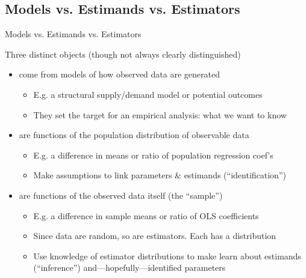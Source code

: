 \documentclass{beamer}
\begin{document}
\subsection{Models vs. Estimands vs. Estimators}
\begin{frame}{Models vs. Estimands vs. Estimators}

Three distinct objects (though not always clearly distinguished) \pause\medskip

\begin{itemize}

  \item {} come from models of how observed data are generated
  \begin{itemize}\itemsep0em
    \item E.g. a structural supply/demand model or potential outcomes
    \item They set the target for an empirical analysis: what we want to know
  \end{itemize}\pause
  
  \item {} are functions of the population distribution of observable data
  \begin{itemize}\itemsep0em
    \item E.g. a difference in means or ratio of population regression coef's
    \item Make assumptions to link parameters \& estimands (``identification'')
  \end{itemize}\pause
  
  \item {} are functions of the observed data itself (the ``sample'')
  \begin{itemize}\itemsep0em
    \item E.g. a difference in sample means or ratio of OLS coefficients 
    \item Since data are random, so are estimators. Each has a distribution
    \item Use knowledge of estimator distributions to make learn about estimands (``inference'') and---hopefully---identified parameters
  \end{itemize}
\end{itemize}
\end{frame}
\end{document}
